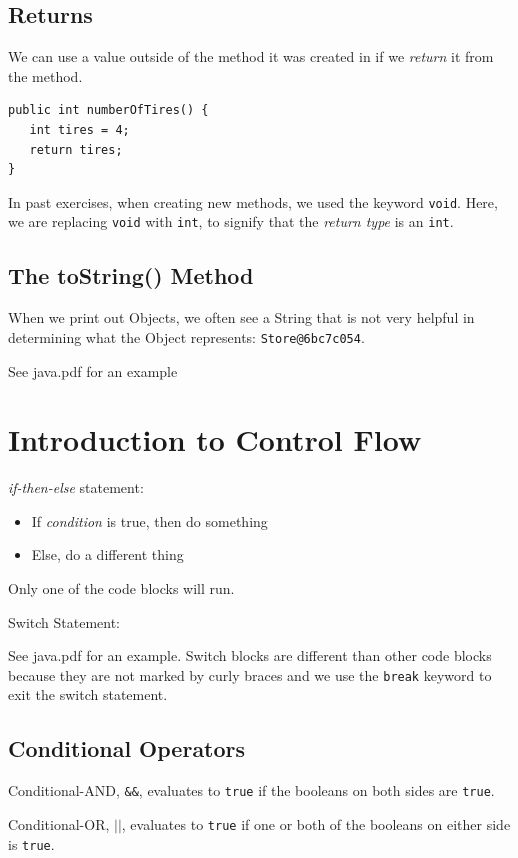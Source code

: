 \documentclass[a4paper, 12pt]{article}
\begin{document}
\subsection{Returns}
We can use a value outside of the method it was created in if we \textit{return} it from the method.
\begin{verbatim}
public int numberOfTires() {
   int tires = 4;
   return tires;
}
\end{verbatim}
In past exercises, when creating new methods, we used the keyword \verb|void|. Here, we are replacing \verb|void| with \verb|int|, to signify that the \textit{return type} is an \verb|int|.

\subsection{The toString() Method}
When we print out Objects, we often see a String that is not very helpful in determining what the Object represents: \verb|Store@6bc7c054|.

See java.pdf for an example


\section{Introduction to Control Flow}
\textit{if-then-else} statement:
\begin{itemize}
\item If \textit{condition} is true, then do something

\item Else, do a different thing

\end{itemize}

Only one of the code blocks will run.

\vspace{1.3em}

Switch Statement:

See java.pdf for an example. Switch blocks are different than other code blocks because they are not marked by curly braces and we use the \verb|break| keyword to exit the switch statement.

\subsection{Conditional Operators}
Conditional-AND, \verb|&&|, evaluates to \verb|true| if the booleans on both sides are \verb|true|.

Conditional-OR, $\vert\vert$, evaluates to \verb|true| if one or both of the booleans on either side is \verb|true|.
\end{document}

